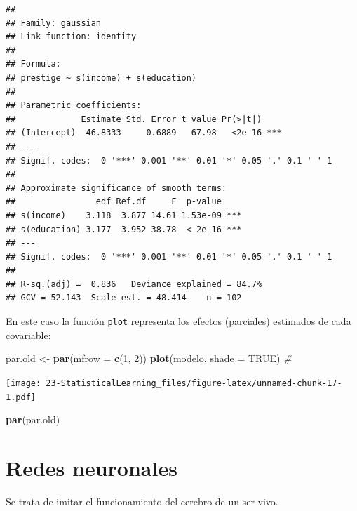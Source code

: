 \documentclass[]{book}
\newenvironment{Shaded}{\begin{snugshade}}{\end{snugshade}}
\newcommand{\KeywordTok}[1]{\textcolor[rgb]{0.13,0.29,0.53}{\textbf{#1}}}
\newcommand{\DataTypeTok}[1]{\textcolor[rgb]{0.13,0.29,0.53}{#1}}
\newcommand{\DecValTok}[1]{\textcolor[rgb]{0.00,0.00,0.81}{#1}}
\newcommand{\StringTok}[1]{\textcolor[rgb]{0.31,0.60,0.02}{#1}}
\newcommand{\CommentTok}[1]{\textcolor[rgb]{0.56,0.35,0.01}{\textit{#1}}}
\newcommand{\OtherTok}[1]{\textcolor[rgb]{0.56,0.35,0.01}{#1}}
\newcommand{\NormalTok}[1]{#1}
\begin{document}
\begin{verbatim}
## 
## Family: gaussian 
## Link function: identity 
## 
## Formula:
## prestige ~ s(income) + s(education)
## 
## Parametric coefficients:
##             Estimate Std. Error t value Pr(>|t|)    
## (Intercept)  46.8333     0.6889   67.98   <2e-16 ***
## ---
## Signif. codes:  0 '***' 0.001 '**' 0.01 '*' 0.05 '.' 0.1 ' ' 1
## 
## Approximate significance of smooth terms:
##                edf Ref.df     F  p-value    
## s(income)    3.118  3.877 14.61 1.53e-09 ***
## s(education) 3.177  3.952 38.78  < 2e-16 ***
## ---
## Signif. codes:  0 '***' 0.001 '**' 0.01 '*' 0.05 '.' 0.1 ' ' 1
## 
## R-sq.(adj) =  0.836   Deviance explained = 84.7%
## GCV = 52.143  Scale est. = 48.414    n = 102
\end{verbatim}

En este caso la función \texttt{plot} representa los efectos (parciales)
estimados de cada covariable:

\begin{Shaded}
\begin{Highlighting}[]
\NormalTok{par.old <-}\StringTok{ }\KeywordTok{par}\NormalTok{(}\DataTypeTok{mfrow =} \KeywordTok{c}\NormalTok{(}\DecValTok{1}\NormalTok{, }\DecValTok{2}\NormalTok{))}
\KeywordTok{plot}\NormalTok{(modelo, }\DataTypeTok{shade =} \OtherTok{TRUE}\NormalTok{) }\CommentTok{# }
\end{Highlighting}
\end{Shaded}

\texttt{[image: 23-StatisticalLearning\_files/figure-latex/unnamed-chunk-17-1.pdf]}

\begin{Shaded}
\begin{Highlighting}[]
\KeywordTok{par}\NormalTok{(par.old)}
\end{Highlighting}
\end{Shaded}

\section{Redes neuronales}\label{redes-neuronales}

Se trata de imitar el funcionamiento del cerebro de un ser vivo.
\end{document}
